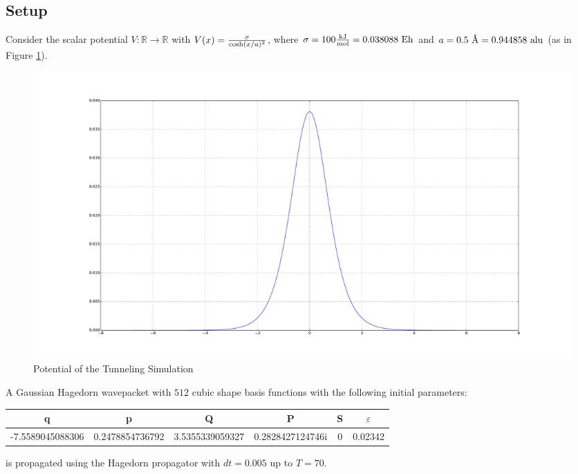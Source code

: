 \subsection{Setup}
Consider the scalar potential $V: \mathbb{R} \rightarrow \mathbb{R}$ with $V(x) = { \sigma \over \cosh(x/a)^2 }$, where $\sigma = 100 {\text{kJ} \over \text{mol}} = 0.038088 \text{ Eh}$ and $a = 0.5\text{ \r{A}} = 0.944858 \text{ alu}$ (as in Figure \ref{fig:tunneling_pot}). 
\begin{figure}
\includegraphics[width=\textwidth]{Figures/tunneling_pot.pdf}
\caption{Potential of the Tunneling Simulation}
\label{fig:tunneling_pot}
\end{figure}
\FloatBarrier

A Gaussian Hagedorn wavepacket with $512$ cubic shape basis functions with the following initial parameters:
\begin{center}
 \begin{tabular}{|c c c c c c|} 
 \hline
 q & p & Q & P & S & $\varepsilon$\\ [0.5ex] 
 \hline
 -7.5589045088306 & 0.2478854736792 & 3.5355339059327 & 0.2828427124746i & 0 & 0.02342\\ 
 \hline
\end{tabular}
\end{center}
is propagated using the Hagedorn propagator with $dt = 0.005$ up to $T = 70$.

